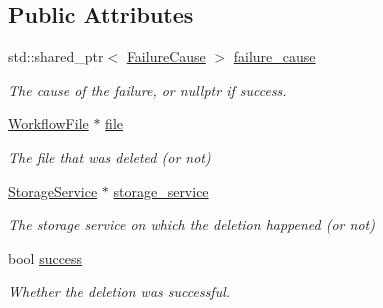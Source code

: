 \subsection*{Public Attributes}
\begin{DoxyCompactItemize}
\item 
\mbox{\label{classwrench_1_1_storage_service_file_delete_answer_message_a50f267b99a1140fba0243ffbe59c6c24}} 
std\+::shared\+\_\+ptr$<$ \hyperlink{classwrench_1_1_failure_cause}{Failure\+Cause} $>$ \hyperlink{classwrench_1_1_storage_service_file_delete_answer_message_a50f267b99a1140fba0243ffbe59c6c24}{failure\+\_\+cause}
\begin{DoxyCompactList}\small\item\em The cause of the failure, or nullptr if success. \end{DoxyCompactList}\item 
\mbox{\label{classwrench_1_1_storage_service_file_delete_answer_message_ad5f601fb45fdde52ed8cadfba1605d4a}} 
\hyperlink{classwrench_1_1_workflow_file}{Workflow\+File} $\ast$ \hyperlink{classwrench_1_1_storage_service_file_delete_answer_message_ad5f601fb45fdde52ed8cadfba1605d4a}{file}
\begin{DoxyCompactList}\small\item\em The file that was deleted (or not) \end{DoxyCompactList}\item 
\mbox{\label{classwrench_1_1_storage_service_file_delete_answer_message_a0edc62449719d2212d5fa344103213c5}} 
\hyperlink{classwrench_1_1_storage_service}{Storage\+Service} $\ast$ \hyperlink{classwrench_1_1_storage_service_file_delete_answer_message_a0edc62449719d2212d5fa344103213c5}{storage\+\_\+service}
\begin{DoxyCompactList}\small\item\em The storage service on which the deletion happened (or not) \end{DoxyCompactList}\item 
\mbox{\label{classwrench_1_1_storage_service_file_delete_answer_message_a5c59359a3d99a50d73af047bf22c18ff}} 
bool \hyperlink{classwrench_1_1_storage_service_file_delete_answer_message_a5c59359a3d99a50d73af047bf22c18ff}{success}
\begin{DoxyCompactList}\small\item\em Whether the deletion was successful. \end{DoxyCompactList}\end{DoxyCompactItemize}
